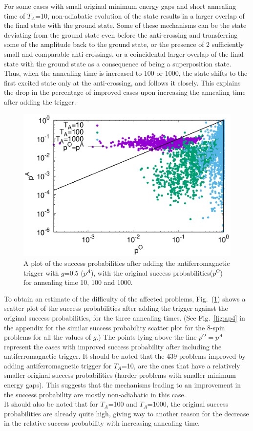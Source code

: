 \documentclass[../main.tex]{subfiles}
\begin{document}
For some cases with small original minimum energy gaps and short annealing time of $T_A$=10, non-adiabatic evolution of the state results in a larger overlap of the final state with the ground state. Some of these mechanisms can be the state deviating from the ground state even before the anti-crossing and transferring some of the amplitude back to the ground state, or the presence of 2 sufficiently small and comparable anti-crossings, or a coincidental larger overlap of the final state with the ground state as a consequence of being a superposition state. Thus, when the annealing time is increased to 100 or 1000, the state shifts to the first excited state only at the anti-crossing, and follows it closely. This explains the drop in the percentage of improved cases upon increasing the annealing time after adding the trigger. 


\begin{figure}
\centering 
\includegraphics[scale=0.8]{ProbScat_g0.eps}
\caption{A plot of the success probabilities after adding the antiferromagnetic trigger with $g$=0.5 ($p^A$), with the original success probabilities($p^O$) for annealing time 10, 100 and 1000.}
\label{fig:a14}
\end{figure}

To obtain an estimate of the difficulty of the affected problems, Fig.~(\ref{fig:a14}) shows a scatter plot of the success probabilities after adding the trigger against the original success probabilities, for the three annealing times. (See Fig.~\ref{fig:ap4} in the appendix for the similar success probability scatter plot for the 8-spin problems for all the values of $g$.) The points lying above the line $p^O=p^A$ represent the cases with improved success probability after including the antiferromagnetic trigger. It should be noted that the 439 problems improved by adding antiferromagnetic trigger for $T_A$=10, are the ones that have a relatively smaller original success probabilities (harder problems with smaller minimum energy gaps). This suggests that the mechanisms leading to an improvement in the success probability are mostly non-adiabatic in this case.\\
It should also be noted that for $T_A$=100 and $T_A$=1000, the original success probabilities are already quite high, giving way to another reason for the decrease in the relative success probability with increasing annealing time. \\
\end{document}
